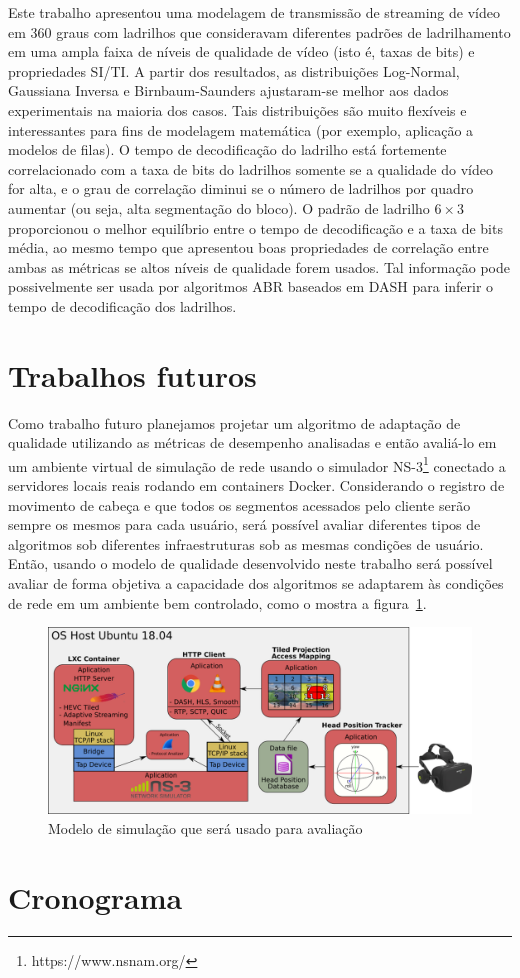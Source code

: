 Este trabalho apresentou uma modelagem de transmissão de streaming de vídeo em 360 graus com ladrilhos que consideravam diferentes padrões de ladrilhamento em uma ampla faixa de níveis de qualidade de vídeo (isto é, taxas de bits) e propriedades SI/TI. A partir dos resultados, as distribuições Log-Normal, Gaussiana Inversa e Birnbaum-Saunders ajustaram-se melhor aos dados experimentais na maioria dos casos. Tais distribuições são muito flexíveis e interessantes para fins de modelagem matemática (por exemplo, aplicação a modelos de filas). O tempo de decodificação do ladrilho está fortemente correlacionado com a taxa de bits do ladrilhos somente se a qualidade do vídeo for alta, e o grau de correlação diminui se o número de ladrilhos por quadro aumentar (ou seja, alta segmentação do bloco). O padrão de ladrilho $6 \times 3$ proporcionou o melhor equilíbrio entre o tempo de decodificação e a taxa de bits média, ao mesmo tempo que apresentou boas propriedades de correlação entre ambas as métricas se altos níveis de qualidade forem usados. Tal informação pode possivelmente ser usada por algoritmos ABR baseados em DASH para inferir o tempo de decodificação dos ladrilhos.


\section{Trabalhos futuros}


Como trabalho futuro planejamos projetar um algoritmo de adaptação de qualidade utilizando as métricas de desempenho analisadas e então avaliá-lo em um ambiente virtual de simulação de rede usando o simulador NS-3\footnote{https://www.nsnam.org/} conectado a servidores locais reais rodando em containers Docker. Considerando o registro de movimento de cabeça e que todos os segmentos acessados pelo cliente serão sempre os mesmos para cada usuário, será possível avaliar diferentes tipos de algoritmos sob diferentes infraestruturas sob as mesmas condições de usuário. Então, usando o modelo de qualidade desenvolvido neste trabalho será possível avaliar de forma objetiva a capacidade dos algoritmos se adaptarem às condições de rede em um ambiente bem controlado, como o mostra a figura~\ref{fig:modelo_simulação}.

\begin{figure}[h]
	\centering
	\includegraphics[width=0.8\linewidth]{fig/modelo_simulação.png}
	\caption{Modelo de simulação que será usado para avaliação}
	\label{fig:modelo_simulação}
\end{figure}


\section{Cronograma}




